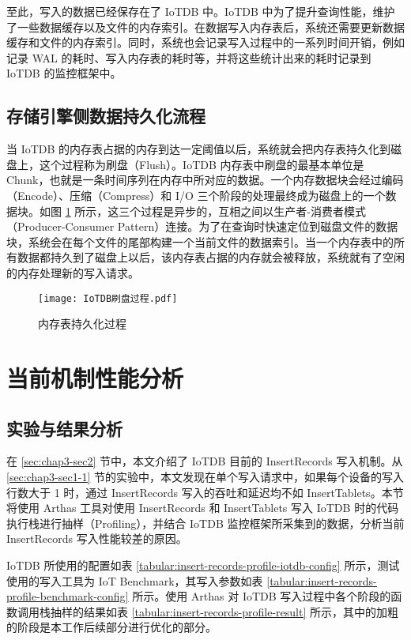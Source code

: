 至此，写入的数据已经保存在了 IoTDB 中。IoTDB 中为了提升查询性能，维护了一些数据缓存以及文件的内存索引。在数据写入内存表后，系统还需要更新数据缓存和文件的内存索引。同时，系统也会记录写入过程中的一系列时间开销，例如记录 WAL 的耗时、写入内存表的耗时等，并将这些统计出来的耗时记录到 IoTDB 的监控框架中。
\subsection{存储引擎侧数据持久化流程}
当 IoTDB 的内存表占据的内存到达一定阈值以后，系统就会把内存表持久化到磁盘上，这个过程称为刷盘（Flush）。IoTDB 内存表中刷盘的最基本单位是 Chunk，也就是一条时间序列在内存中所对应的数据。一个内存数据块会经过编码（Encode）、压缩（Compress）和 I/O 三个阶段的处理最终成为磁盘上的一个数据块。如图 \ref{fig:memtable-flush} 所示，这三个过程是异步的，互相之间以生产者-消费者模式（Producer-Consumer Pattern）连接。为了在查询时快速定位到磁盘文件的数据块，系统会在每个文件的尾部构建一个当前文件的数据索引。当一个内存表中的所有数据都持久到了磁盘上以后，该内存表占据的内存就会被释放，系统就有了空闲的内存处理新的写入请求。

\begin{figure}
  \centering
  \texttt{[image: IoTDB刷盘过程.pdf]}
  \caption{内存表持久化过程}
  \label{fig:memtable-flush}
\end{figure}

\section{当前机制性能分析}
\subsection{实验与结果分析\label{sec:chap3-sec3-1}}
在 \ref{sec:chap3-sec2} 节中，本文介绍了 IoTDB 目前的 InsertRecords 写入机制。从 \ref{sec:chap3-sec1-1} 节的实验中，本文发现在单个写入请求中，如果每个设备的写入行数大于 1 时，通过 InsertRecords 写入的吞吐和延迟均不如 InsertTablets。本节将使用 Arthas 工具对使用 InsertRecords 和 InsertTablets 写入 IoTDB 时的代码执行栈进行抽样（Profiling），并结合 IoTDB 监控框架所采集到的数据，分析当前 InsertRecords 写入性能较差的原因。

IoTDB 所使用的配置如表 \ref{tabular:insert-records-profile-iotdb-config} 所示，测试使用的写入工具为 IoT Benchmark\cite{liu2019benchmarking}，其写入参数如表 \ref{tabular:insert-records-profile-benchmark-config} 所示。使用 Arthas 对 IoTDB 写入过程中各个阶段的函数调用栈抽样的结果如表 \ref{tabular:insert-records-profile-result} 所示，其中的加粗的阶段是本工作后续部分进行优化的部分。

